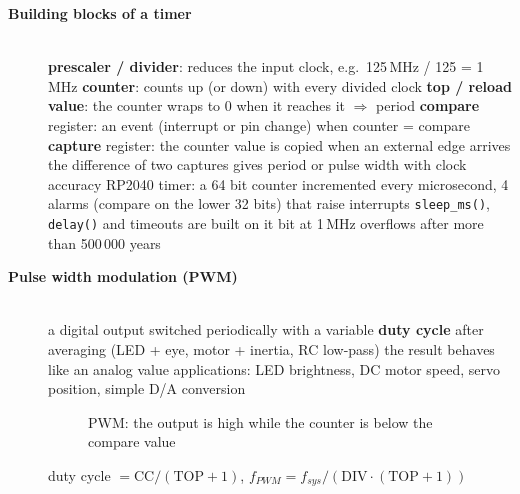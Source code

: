 \begin{description}
\item[{\rot\bf Building blocks of a timer}]~\\[-\lblskip]
\bi
	\ite \textbf{prescaler / divider}: reduces the input clock, e.g.\ 125\,MHz / 125 = 1\,MHz
	\ite \textbf{counter}: counts up (or down) with every divided clock
	\ite \textbf{top / reload value}: the counter wraps to 0 when it reaches it $\Rightarrow$ period
	\ite \textbf{compare} register: an event (interrupt or pin change) when counter = compare
	\ite \textbf{capture} register: the counter value is copied when an external edge arrives
	\bi
		\ite the difference of two captures gives period or pulse width with clock accuracy
	\ei
\ei
\bi
	\ite RP2040 timer: a 64 bit counter incremented every microsecond, 4 alarms (compare on the lower 32 bits) that raise interrupts
	\bi
		\ite \texttt{sleep\_ms()}, \texttt{delay()} and timeouts are built on it
		 bit at 1\,MHz overflows after more than 500\,000 years
	\ei
\ei
\os{\newpage}

\item[{\rot\bf Pulse width modulation (PWM)}]~\\[-\lblskip]
\bi
	\ite a digital output switched periodically with a variable \textbf{duty cycle}
	\ite after averaging (LED + eye, motor + inertia, RC low-pass) the result behaves like an analog value
	\ite applications: LED brightness, DC motor speed, servo position, simple D/A conversion
\ei
\begin{figure}[!hbtp]
\begin{center}
\caption{PWM: the output is high while the counter is below the compare value}
\end{center}
\end{figure}
\bi
	\ite duty cycle $= \mathrm{CC} / (\mathrm{TOP}+1)$, \quad $f_{PWM} = f_{sys} / (\mathrm{DIV}\cdot(\mathrm{TOP}+1))$
\ei
\os{\newpage}


\end{description}
